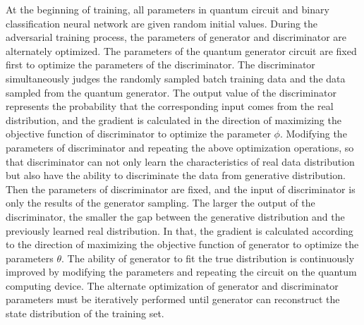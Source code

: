 \documentclass{bmcart}
\begin{document}
At the beginning of training, all parameters in quantum circuit and binary classification neural network are given random initial values. During the adversarial training process, the parameters of generator and discriminator are alternately optimized. The parameters of the quantum generator circuit are fixed first to optimize the parameters of the discriminator. The discriminator simultaneously judges the randomly sampled batch training data and the data sampled from the quantum generator. The output value of the discriminator represents the probability that the corresponding input comes from the real distribution, and the gradient is calculated in the direction of maximizing the objective function of discriminator to optimize the parameter $\phi $. Modifying the parameters of discriminator and repeating the above optimization operations, so that discriminator can not only learn the characteristics of real data distribution but also have the ability to discriminate the data from generative distribution. Then the parameters of discriminator are fixed, and the input of discriminator is only the results of the generator sampling. The larger the output of the discriminator, the smaller the gap between the generative distribution and the previously learned real distribution. In that, the gradient is calculated according to the direction of maximizing the objective function of generator to optimize the parameters $\theta $. The ability of generator to fit the true distribution is continuously improved by modifying the parameters and repeating the circuit on the quantum computing device. The alternate optimization of generator and discriminator parameters must be iteratively performed until generator can reconstruct the state distribution of the training set.
\end{document}
